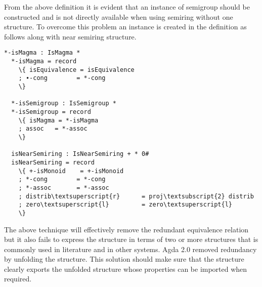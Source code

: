 From the above definition it is evident that an instance of semigroup should be constructed and is not directly available when using semiring without one structure. To overcome this problem an instance is created in the definition as follows along with near semiring structure. \\
\begin{Verbatim}[commandchars=\\\{\}]
  *-isMagma : IsMagma *
  *-isMagma = record
    \{ isEquivalence = isEquivalence
    ; ∙-cong        = *-cong
    \}

  *-isSemigroup : IsSemigroup *
  *-isSemigroup = record
    \{ isMagma = *-isMagma
    ; assoc   = *-assoc
    \}

  isNearSemiring : IsNearSemiring + * 0#
  isNearSemiring = record
    \{ +-isMonoid    = +-isMonoid
    ; *-cong        = *-cong
    ; *-assoc       = *-assoc
    ; distrib\textsuperscript{r}      = proj\textsubscript{2} distrib
    ; zero\textsuperscript{l}         = zero\textsuperscript{l}
    \}
\end{Verbatim}
The above technique will effectively remove the redundant equivalence relation but it also fails to express the structure in terms of two or more structures that is commonly used in literature and in other systems. Agda 2.0 removed redundancy by unfolding the structure. This solution should make sure that the structure clearly exports the unfolded structure whose properties can be imported when required.


